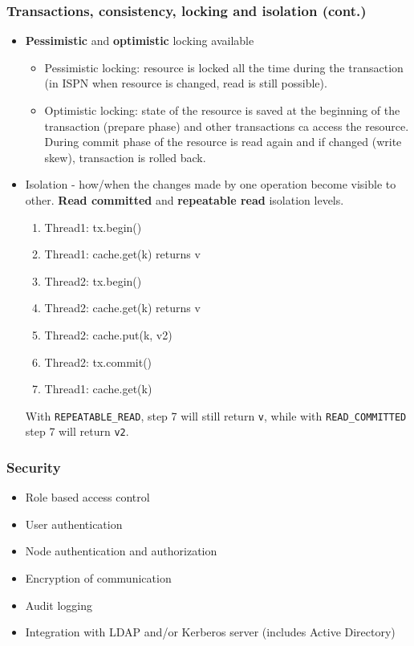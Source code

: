 \documentclass[10pt,utf8]{beamer}
\begin{document}
\begin{frame}
	\frametitle{Transactions, consistency, locking and isolation (cont.)}
	\begin{itemize}
		\item \textbf{Pessimistic} and \textbf{optimistic} locking available
		\begin{itemize}
		\pause
		\item Pessimistic locking: resource is locked all the time during the transaction (in ISPN when resource is changed, read is still possible).
		\pause
		\item Optimistic locking: state of the resource is saved at the beginning of the transaction (prepare phase) and other transactions ca access the resource. During commit phase of the resource 
		is read again and if changed (write skew), transaction is rolled back.
		\end{itemize}
		\pause
		\item Isolation - how/when the changes made by one operation become visible to other. \textbf{Read committed} and \textbf{repeatable read} isolation levels.
			\begin{enumerate}
				\pause
				\item \color{MyDarkGreen}Thread1: tx.begin()
				\pause
				\item Thread1: cache.get(k) returns v
				\pause
				\item \color{magenta}Thread2: tx.begin()
				\pause
				\item Thread2: cache.get(k) returns v
				\pause
				\item Thread2: cache.put(k, v2)
				\pause
				\item Thread2: tx.commit()
				\pause
				\item \color{MyDarkGreen}Thread1: cache.get(k)
				\pause
			\end{enumerate}
			With \texttt{REPEATABLE\_READ}, step 7 will still return \texttt{v}, while with \texttt{READ\_COMMITTED} step 7 will return \texttt{v2}.
	\end{itemize}
\end{frame}

\begin{frame}
	\frametitle{Security}
	\begin{itemize}
	 \item Role based access control
	 \item User authentication
	 \item Node authentication and authorization
	 \item Encryption of communication
	 \item Audit logging
	 \item Integration with LDAP and/or Kerberos server (includes Active Directory)
	\end{itemize}
\end{frame}
\end{document}
